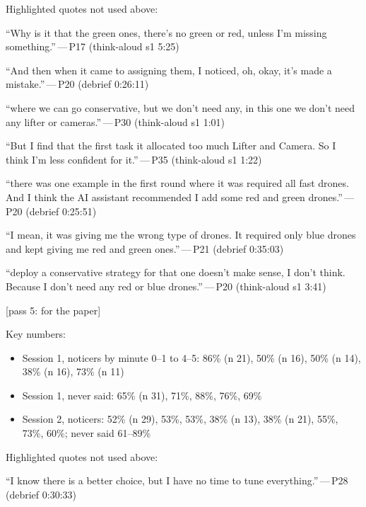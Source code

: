 \begin{options}
\noindent Highlighted quotes not used above:\begin{quotelist}
\item ``Why is it that the green ones, there's no green or red, unless I'm missing something.''\,---\,P17 (think-aloud s1 5:25)
\item ``And then when it came to assigning them, I noticed, oh, okay, it's made a mistake.''\,---\,P20 (debrief 0:26:11)
\item ``where we can go conservative, but we don't need any, in this one we don't need any lifter or cameras.''\,---\,P30 (think-aloud s1 1:01)
\item ``But I find that the first task it allocated too much Lifter and Camera. So I think I'm less confident for it.''\,---\,P35 (think-aloud s1 1:22)
\item ``there was one example in the first round where it was required all fast drones. And I think the AI assistant recommended I add some red and green drones.''\,---\,P20 (debrief 0:25:51)
\item ``I mean, it was giving me the wrong type of drones. It required only blue drones and kept giving me red and green ones.''\,---\,P21 (debrief 0:35:03)
\item ``deploy a conservative strategy for that one doesn't make sense, I don't think. Because I don't need any red or blue drones.''\,---\,P20 (think-aloud s1 3:41)
\end{quotelist}

 {\footnotesize [pass 5: for the paper]}

\noindent Key numbers:\begin{itemize}[leftmargin=1.2em,itemsep=0pt]\footnotesize
\item Session 1, noticers by minute 0--1 to 4--5: 86\% (n 21), 50\% (n 16), 50\% (n 14), 38\% (n 16), 73\% (n 11)
\item Session 1, never said: 65\% (n 31), 71\%, 88\%, 76\%, 69\%
\item Session 2, noticers: 52\% (n 29), 53\%, 53\%, 38\% (n 13), 38\% (n 21), 55\%, 73\%, 60\%; never said 61--89\%
\end{itemize}

\noindent Highlighted quotes not used above:\begin{quotelist}
\item ``I know there is a better choice, but I have no time to tune everything.''\,---\,P28 (debrief 0:30:33)
\end{quotelist}


\end{options}
